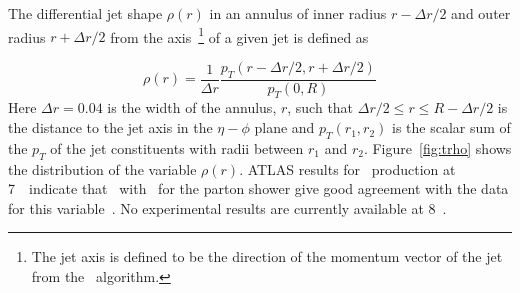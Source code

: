 \begin{table}
\hfill
{}
\caption{The mean fragmentation function for (a)~$b$-jets and $c$-jets in the 
high \pT~jet sample and for the subset
of (b)~$b$-jets and ~$c$-jets 
satisfying the additional requirement that there be no other weakly decaying
heavy flavor hadron with $\pt>5.0$~\GeV\ within a cone $\Delta R=1$ of the jet.}
\label{t:jz4frag}
\end{table}
The differential jet shape $\rho (r)$ in an annulus of inner radius $r-\Delta r /2$ and outer radius $r+\Delta r /2$ from the axis~\footnote{The jet axis is defined to be the direction of the momentum vector of the jet from the \antiktfour\ algorithm.} of a given jet is defined as

$$
\rho(r) = \frac{1}{\Delta r} \frac{p_T \left(r-\Delta r /2, r+\Delta r /2 \right)}{p_T \left(0, R \right)}
$$ 
\noindent
Here $\Delta r = 0.04$ is the width of the annulus, $r$, such that $\Delta r /2 \leq r \leq R - \Delta r /2$ is the distance to the jet axis in the $\eta-\phi$ plane and $p_T(r_1, r_2)$ is the scalar sum of the $p_T$ of the jet constituents with radii between $r_1$ and $r_2$. Figure~\ref{fig:trho} shows the distribution of the variable $\rho(r)$. 
ATLAS results for \ttbar\ production at 7~\TeV\ indicate that \PowHeg\ with \Pythia\ for the parton shower give
good agreement with the data for this variable~\cite{Aad:2013fba}. No experimental results are currently available at 8~\TeV.

